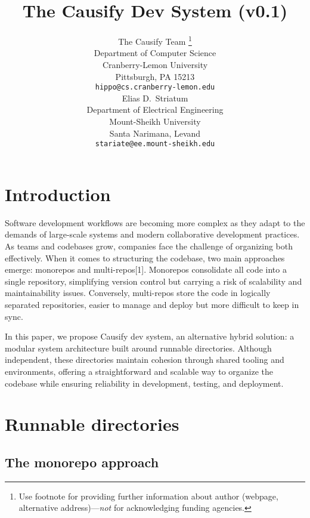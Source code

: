 \documentclass{article}
\title{The Causify Dev System (v0.1)}
\author{ The Causify Team
\thanks{Use footnote for providing further information about author (webpage,
alternative address)---\emph{not} for acknowledging funding agencies.} \\
Department of Computer Science\\
Cranberry-Lemon University\\
Pittsburgh, PA
15213
\\ \texttt{hippo@cs.cranberry-lemon.edu} \\
\And
Elias D.~Striatum \\
Department of Electrical Engineering\\
Mount-Sheikh University\\
Santa Narimana, Levand \\
\texttt{stariate@ee.mount-sheikh.edu} \\
}
\begin{document}
  \maketitle

  \begin{abstract}
  \end{abstract}


  \section{Introduction}
  Software development workflows are becoming more complex as they adapt to the
  demands of large-scale systems and modern collaborative development practices.
  As teams and codebases grow, companies face the challenge of organizing both
  effectively. When it comes to structuring the codebase, two main approaches
  emerge: monorepos and multi-repos[1]. Monorepos consolidate all code into a
  single repository, simplifying version control but carrying a risk of
  scalability and maintainability issues. Conversely, multi-repos store the code
  in logically separated repositories, easier to manage and deploy but more
  difficult to keep in sync.

  In this paper, we propose Causify dev system, an alternative hybrid solution: a
  modular system architecture built around runnable directories. Although
  independent, these directories maintain cohesion through shared tooling and
  environments, offering a straightforward and scalable way to organize the
  codebase while ensuring reliability in development, testing, and deployment.


  \section{Runnable directories}

  \subsection{The monorepo approach}
\end{document}
